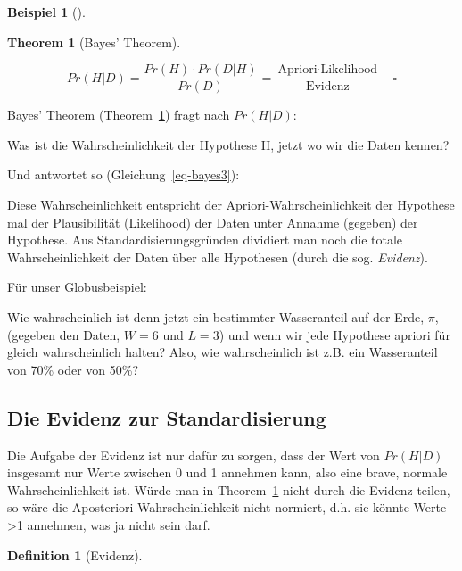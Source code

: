 \documentclass[
  ngerman,
  letterpaper,
  twoside,
  open=any]{scrbook}
\theoremstyle{definition}
\newtheorem{example}{Beispiel}[chapter]
\theoremstyle{plain}
\newtheorem{theorem}{Theorem}[chapter]
\theoremstyle{definition}
\theoremstyle{definition}
\newtheorem{definition}{Definition}[chapter]
\theoremstyle{remark}
\begin{document}
\begin{example}[]
\begin{theorem}[Bayes'
Theorem]\protect\hypertarget{thm-bayes1}{}\label{thm-bayes1}

\[
Pr(H|D) = \frac{ Pr(H) \cdot Pr(D|H) }{Pr(D)} = \frac{\text{Apriori} \cdot \text{Likelihood}} {\text{Evidenz}}\quad \square\]

\end{theorem}

Bayes' Theorem (Theorem~\ref{thm-bayes1}) fragt nach \(Pr(H|D)\):

\begin{displayquote}
Was ist die Wahrscheinlichkeit der Hypothese H, jetzt wo wir die Daten
kennen?
\end{displayquote}

Und antwortet so (Gleichung~\ref{eq-bayes3}):

\begin{displayquote}
Diese Wahrscheinlichkeit entspricht der Apriori-Wahrscheinlichkeit der
Hypothese mal der Plausibilität (Likelihood) der Daten unter Annahme
(gegeben) der Hypothese. Aus Standardisierungsgründen dividiert man noch
die totale Wahrscheinlichkeit der Daten über alle Hypothesen (durch die
sog. \emph{Evidenz}).
\end{displayquote}

Für unser Globusbeispiel:

\begin{displayquote}
Wie wahrscheinlich ist denn jetzt ein bestimmter Wasseranteil auf der
Erde, \(\pi\), (gegeben den Daten, \(W=6\) und \(L=3\)) und wenn wir
jede Hypothese apriori für gleich wahrscheinlich halten? Also, wie
wahrscheinlich ist z.B. ein Wasseranteil von 70\% oder von 50\%?
\end{displayquote}

\subsection{Die Evidenz zur
Standardisierung}\label{die-evidenz-zur-standardisierung}

Die Aufgabe der Evidenz ist nur dafür zu sorgen, dass der Wert von
\(Pr(H|D)\) insgesamt nur Werte zwischen 0 und 1 annehmen kann, also
eine brave, normale Wahrscheinlichkeit ist. Würde man in
Theorem~\ref{thm-bayes1} nicht durch die Evidenz teilen, so wäre die
Aposteriori-Wahrscheinlichkeit nicht normiert, d.h. sie könnte Werte
\textgreater1 annehmen, was ja nicht sein darf.

\begin{definition}[Evidenz]\protect\hypertarget{def-evidenz}{}\label{def-evidenz}


\end{definition}
\end{example}
\end{document}
